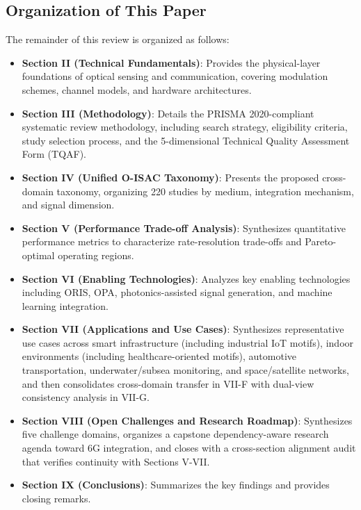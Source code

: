 \documentclass[lettersize,journal]{IEEEtran}
\begin{document}
\subsection{Organization of This Paper}

The remainder of this review is organized as follows:

\begin{itemize}
    \item \textbf{Section II (Technical Fundamentals)}: Provides the physical-layer foundations of optical sensing and communication, covering modulation schemes, channel models, and hardware architectures.
    \item \textbf{Section III (Methodology)}: Details the PRISMA 2020-compliant systematic review methodology, including search strategy, eligibility criteria, study selection process, and the 5-dimensional Technical Quality Assessment Form (TQAF).
    \item \textbf{Section IV (Unified O-ISAC Taxonomy)}: Presents the proposed cross-domain taxonomy, organizing 220 studies by medium, integration mechanism, and signal dimension.
    \item \textbf{Section V (Performance Trade-off Analysis)}: Synthesizes quantitative performance metrics to characterize rate-resolution trade-offs and Pareto-optimal operating regions.
    \item \textbf{Section VI (Enabling Technologies)}: Analyzes key enabling technologies including ORIS, OPA, photonics-assisted signal generation, and machine learning integration.
    \item \textbf{Section VII (Applications and Use Cases)}: Synthesizes representative use cases across smart infrastructure (including industrial IoT motifs), indoor environments (including healthcare-oriented motifs), automotive transportation, underwater/subsea monitoring, and space/satellite networks, and then consolidates cross-domain transfer in VII-F with dual-view consistency analysis in VII-G.
    \item \textbf{Section VIII (Open Challenges and Research Roadmap)}: Synthesizes five challenge domains, organizes a capstone dependency-aware research agenda toward 6G integration, and closes with a cross-section alignment audit that verifies continuity with Sections V-VII.
    \item \textbf{Section IX (Conclusions)}: Summarizes the key findings and provides closing remarks.
\end{itemize}
\end{document}
